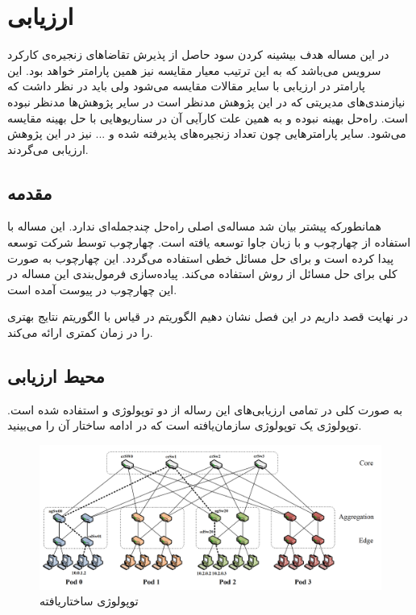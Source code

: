 
\chapter{ارزیابی}

در این مساله هدف بیشینه کردن سود حاصل از پذیرش تقاضاهای زنجیره‌ی کارکرد سرویس می‌باشد که به این ترتیب معیار مقایسه نیز همین پارامتر خواهد بود. این پارامتر در ارزیابی با سایر مقالات مقایسه می‌شود ولی باید در نظر داشت که نیازمندی‌های مدیریتی که در این پژوهش مدنظر است در سایر پژوهش‌ها مدنظر نبوده است.
راه‌حل  بهینه نبوده و به همین علت کارآیی آن در سناریوهایی با حل بهینه مقایسه می‌شود.
سایر پارامترهایی چون تعداد زنجیره‌های پذیرفته شده و ... نیز در این پژوهش ارزیابی می‌گردند.

\section{مقدمه}

همانطورکه پیشتر بیان شد مساله‌ی اصلی راه‌حل چندجمله‌ای ندارد. این مساله با استفاده از چهارچوب  و با زبان جاوا
توسعه یافته است. چهارچوب  توسط شرکت  توسعه پیدا کرده است و برای حل مسائل خطی استفاده می‌گردد. این
چهارچوب به صورت کلی برای حل مسائل  از روش  استفاده می‌کند. پیاده‌سازی فرمول‌بندی این مساله در این چهارچوب
در پیوست آمده است.

در نهایت قصد داریم در این فصل نشان دهیم الگوریتم  در قیاس با الگوریتم  نتایج بهتری را در زمان کمتری ارائه می‌کند.

\section{محیط ارزیابی}
به صورت کلی در تمامی ارزیابی‌های این رساله از دو توپولوژی  و  استفاده شده است.
توپولوژی  یک توپولوژی سازمان‌یافته است که در ادامه ساختار آن را می‌بینید.


\begin{figure}[!h]
\center\includegraphics[scale=.25]{images/fattree}
\caption{توپولوژی ساختاریافته }
\label{fig.2}
\end{figure}

